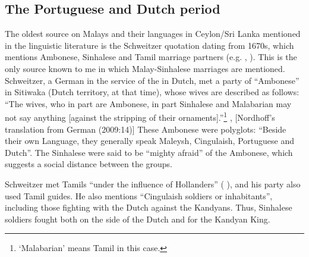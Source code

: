 \subsection{The Portuguese and Dutch period}%
The oldest source on Malays and their languages in Ceylon/Sri Lanka mentioned in the linguistic literature is the Schweitzer quotation dating from 1670s, which mentions Ambonese, Sinhalese and Tamil marriage partners (e.g. \citet[14]{Nordhoff2009}, \citet{SmithEtAl2006cll}). This is the only source known to me in which Malay-Sinhalese marriages are mentioned. Schweitzer, a German in the service of the in Dutch, met a party of ``Ambonese'' in Sitiwaka (Dutch territory, at that time), whose wives are described as follows: ``The wives, who in part are Ambonese, in part Sinhalese and Malabarian may not say anything [against the stripping of their ornaments].''\footnote{`Malabarian' means Tamil in this case.} \citep[106]{Schweitzer1931}, [Nordhoff's translation from German (2009:14)] These Ambonese were polyglots: ``Beside their own Language, they generally speak Maleysh, Cingulaish, Portuguese and Dutch''.
The Sinhalese were said to be ``mighty afraid'' of the Ambonese, which suggests a social distance between the groups.%

Schweitzer met Tamils ``under the influence of Hollanders''
(\citeauthor{Schweitzer1931} \citeyear{Schweitzer1931}),
and his party also used Tamil guides.
He also mentions ``Cingulaish soldiers or inhabitants'',
including those fighting with the Dutch against the Kandyans.
Thus, Sinhalese soldiers fought both on the side of the Dutch and for the Kandyan King.


